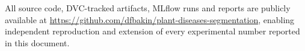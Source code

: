\documentclass[11pt,a4paper]{article}
\begin{document}
All source code, DVC-tracked artifacts, MLflow runs and reports are
publicly available at
\url{https://github.com/dfbakin/plant-diseases-segmentation}, enabling
independent reproduction and extension of every experimental number
reported in this document.



\end{document}
